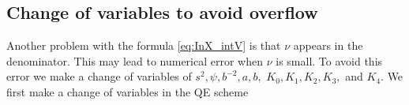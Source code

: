 \documentclass{ws-ijfe}
\begin{document}
\subsection{Change of variables to avoid overflow}
Another problem with the formula \eqref{eq:InX_intV} is that $\nu$ appears in the denominator. This may lead to numerical error when $\nu$ is small. To avoid this error we make a change of variables of $s^2, \psi, b^{-2}, a, b, $ $K_0,K_1,K_2, K_3,$ and $ K_4$.
We first make a change of variables in the QE scheme
\end{document}
